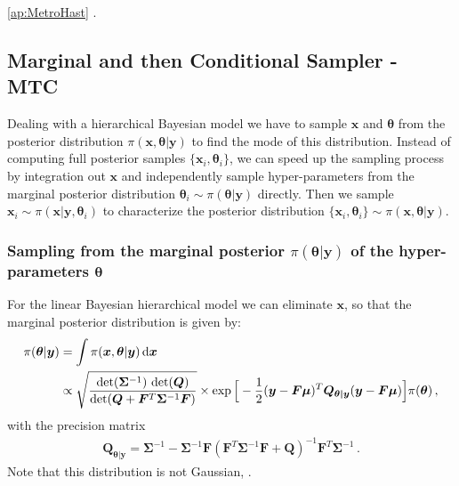 \ref{ap:MetroHast} .


\subsection{Marginal and then Conditional Sampler - MTC}
\label{subsec:MTC}
Dealing with a hierarchical Bayesian model we have to sample $\bm{x}$ and $\bm{\theta}$ from the posterior distribution $\pi(\bm{x}, \bm{\theta}| \bm{y})$ to find the mode of this distribution.
Instead of computing full posterior samples $\{ \bm{x}_i, \bm{\theta}_i \} $, we can speed up the sampling process by integration out $\bm{x}$ and independently sample hyper-parameters from the marginal posterior distribution $\bm{\theta}_i \sim \pi(\bm{\theta}| \bm{y})$ directly.
Then we sample $\bm{x}_i \sim \pi(\bm{x}|   \bm{y}, \bm{\theta}_i)$ to characterize the posterior distribution $\{ \bm{x}_i, \bm{\theta}_i \} \sim \pi(\bm{x}, \bm{\theta}| \bm{y})$.


\subsubsection{Sampling from the marginal posterior $\pi(\bm{\theta}| \bm{y})$ of the hyper-parameters $\bm{\theta}$}

For the linear Bayesian hierarchical model we can eliminate $\bm{x}$, so that the marginal posterior distribution is given by:
\begin{align}
    \pi(\bm{\theta} | \bm{y}) &= \int \pi(\bm{x}, \bm{\theta} | \bm{y}) \mathop{}\!\mathrm{d} \bm{x} \\ 
    \label{eq:condHyper}
    &\propto \sqrt{ \frac{ \det( \bm{\Sigma}^{-1} ) \,  \det( \bm{Q}) }{\det( \bm{Q} + \bm{F}^T \bm{\Sigma}^{-1} \bm{F} ) } } \times \exp \Big[ - \frac{1}{2}(\bm{y} -\bm{F \mu})^T \bm{Q}_{\bm{\theta|y}} (\bm{y} -\bm{F \mu}) \Big] \pi(\bm{\theta}) \, ,
\end{align}
with the precision matrix
\begin{align}
\bm{Q}_{\bm{\theta|y}} = \bm{\Sigma}^{-1} - \bm{\Sigma}^{-1} \bm{F} (\bm{F}^T \bm{\Sigma}^{-1} \bm{F} + \bm{Q} )^{-1} \bm{F}^T \bm{\Sigma}^{-1} \,  .
\end{align}
Note that this distribution is not Gaussian, \cite{fox2016fast}.

